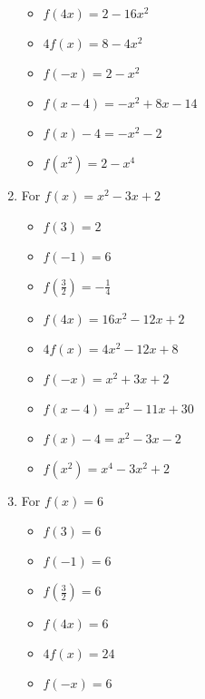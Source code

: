 \documentclass{ximera}
\begin{document}
\begin{enumerate}
\begin{itemize}
\item  $f(4x) = 2-16x^2$
\item $4f(x) = 8-4x^2$
\item $f(-x) = 2-x^2$
\end{itemize}


\begin{itemize}
\item  $f(x-4) = -x^2+8x-14$
\item $f(x) - 4 = -x^{2} - 2$
\item  $f\left(x^2\right) = 2-x^4$
\end{itemize}


\item For $f(x) = x^2 - 3x + 2$ 


\begin{itemize}
\item $f(3) = 2$
\item $f(-1) = 6$
\item $f\left(\frac{3}{2} \right) = -\frac{1}{4}$
\end{itemize}


\begin{itemize}
\item  $f(4x) = 16x^2-12x+2$
\item $4f(x) = 4x^2-12x+8$
\item $f(-x) = x^2+3x+2$
\end{itemize}


\begin{itemize}
\item  $f(x-4) = x^2-11x+30$
\item $f(x) - 4 = x^2-3x-2$
\item  $f\left(x^2\right) = x^4-3x^2+2$
\end{itemize}




\item For $f(x) = 6$ 



\begin{itemize}
\item $f(3) = 6$
\item $f(-1) =6$
\item $f\left(\frac{3}{2} \right) = 6$
\end{itemize}


\begin{itemize}
\item  $f(4x) = 6$
\item $4f(x) = 24$
\item $f(-x) = 6$
\end{itemize}



\end{enumerate}
\end{document}
